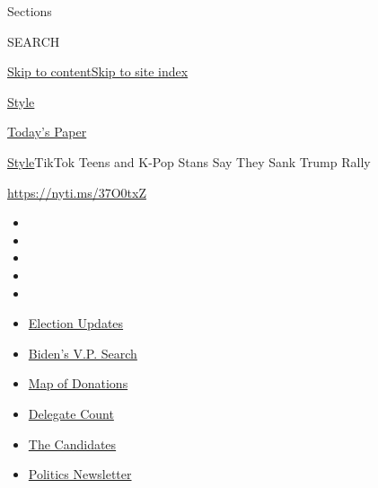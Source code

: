 Sections

SEARCH

\protect\hyperlink{site-content}{Skip to
content}\protect\hyperlink{site-index}{Skip to site index}

\href{https://www.nytimes.com/section/style}{Style}

\href{https://myaccount.nytimes.com/auth/login?response_type=cookie\&client_id=vi}{}

\href{https://www.nytimes.com/section/todayspaper}{Today's Paper}

\href{/section/style}{Style}\textbar{}TikTok Teens and K-Pop Stans Say
They Sank Trump Rally

\url{https://nyti.ms/37O0txZ}

\begin{itemize}
\item
\item
\item
\item
\item
\end{itemize}

\begin{itemize}
\item
  \href{https://www.nytimes.com/2020/08/03/us/elections/biden-vs-trump.html?action=click\&pgtype=Article\&state=default\&region=TOP_BANNER\&context=storylines_menu}{Election
  Updates}
\item
  \href{https://www.nytimes.com/article/biden-vice-president-2020.html?action=click\&pgtype=Article\&state=default\&region=TOP_BANNER\&context=storylines_menu}{Biden's
  V.P. Search}
\item
  \href{https://www.nytimes.com/interactive/2020/07/24/us/politics/trump-biden-campaign-donors.html?action=click\&pgtype=Article\&state=default\&region=TOP_BANNER\&context=storylines_menu}{Map
  of Donations}
\item
  \href{https://www.nytimes.com/interactive/2020/us/elections/delegate-count-primary-results.html?action=click\&pgtype=Article\&state=default\&region=TOP_BANNER\&context=storylines_menu}{Delegate
  Count}
\item
  \href{https://www.nytimes.com/interactive/2019/us/politics/2020-presidential-candidates.html?action=click\&pgtype=Article\&state=default\&region=TOP_BANNER\&context=storylines_menu}{The
  Candidates}
\item
  \href{https://www.nytimes.com/newsletters/politics?action=click\&pgtype=Article\&state=default\&region=TOP_BANNER\&context=storylines_menu}{Politics
  Newsletter}
\end{itemize}

